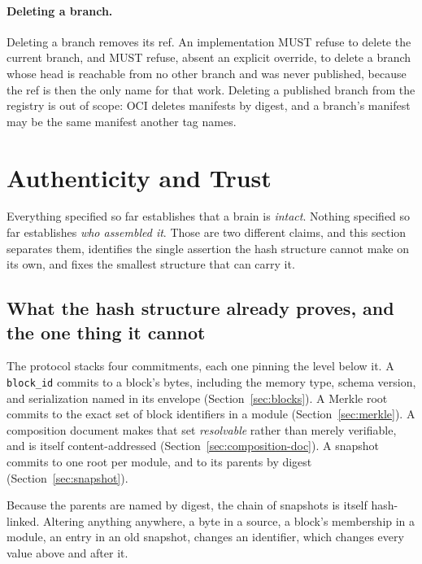 \documentclass[11pt,a4paper]{article}
\begin{document}
\paragraph{Deleting a branch.}
Deleting a branch removes its ref. An implementation MUST refuse to delete
the current branch, and MUST refuse, absent an explicit override, to delete a
branch whose head is reachable from no other branch and was never published,
because the ref is then the only name for that work. Deleting a published
branch from the registry is out of scope: OCI deletes manifests by digest,
and a branch's manifest may be the same manifest another tag names.

\section{Authenticity and Trust}
\label{sec:authenticity}

Everything specified so far establishes that a brain is \emph{intact}. Nothing
specified so far establishes \emph{who assembled it}. Those are two different
claims, and this section separates them, identifies the single assertion the
hash structure cannot make on its own, and fixes the smallest structure that can
carry it.

\subsection{What the hash structure already proves, and the one thing it cannot}
\label{sec:integrity-total}

The protocol stacks four commitments, each one pinning the level below it. A
\texttt{block\_id} commits to a block's bytes, including the memory type, schema
version, and serialization named in its envelope (Section~\ref{sec:blocks}). A
Merkle root commits to the exact set of block identifiers in a module
(Section~\ref{sec:merkle}). A composition document makes that set
\emph{resolvable} rather than merely verifiable, and is itself content-addressed
(Section~\ref{sec:composition-doc}). A snapshot commits to one root per module,
and to its parents by digest (Section~\ref{sec:snapshot}).

Because the parents are named by digest, the chain of snapshots is itself
hash-linked. Altering anything anywhere, a byte in a source, a block's
membership in a module, an entry in an old snapshot, changes an identifier,
which changes every value above and after it.
\end{document}
